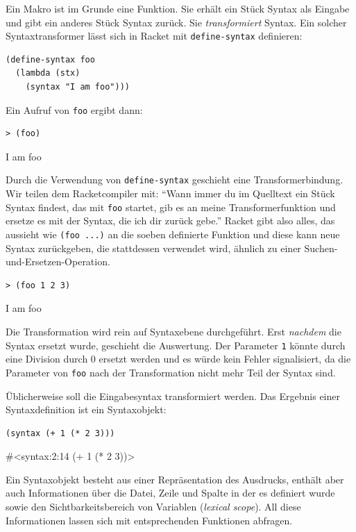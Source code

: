 Ein Makro ist im Grunde eine Funktion. Sie erhält ein Stück Syntax als Eingabe und gibt ein anderes Stück Syntax zurück. Sie \textit{transformiert} Syntax. Ein solcher Syntaxtransformer lässt sich in Racket mit \texttt{define-syntax} definieren:

\begin{lstlisting}
(define-syntax foo
  (lambda (stx)
    (syntax "I am foo")))
\end{lstlisting}

Ein Aufruf von \texttt{foo} ergibt dann:

\begin{lstlisting}
> (foo)
\end{lstlisting}
{\routput {\qq}I am foo{\qq}}

Durch die Verwendung von \texttt{define-syntax} geschieht eine Transformerbindung. Wir teilen dem Racketcompiler mit: ``Wann immer du im Quelltext ein Stück Syntax findest, das mit \texttt{foo} startet, gib es an meine Transformerfunktion und ersetze es mit der Syntax, die ich dir zurück gebe.'' Racket gibt also alles, das aussieht wie \texttt{(foo ...)} an die soeben definierte Funktion und diese kann neue Syntax zurückgeben, die stattdessen verwendet wird, ähnlich zu einer Suchen-und-Ersetzen-Operation.

\begin{lstlisting}
> (foo 1 2 3)
\end{lstlisting}
{\routput {\qq}I am foo\qq}

Die Transformation wird rein auf Syntaxebene durchgeführt. Erst \textit{nachdem} die Syntax ersetzt wurde, geschieht die Auswertung. Der Parameter \texttt{1} könnte  durch eine Division durch 0 ersetzt werden und es würde kein Fehler signalisiert, da die Parameter von \texttt{foo} nach der Transformation nicht mehr Teil der Syntax sind.

Üblicherweise soll die Eingabesyntax transformiert werden. Das Ergebnis einer Syntaxdefinition ist ein Syntaxobjekt:

\begin{lstlisting}
(syntax (+ 1 (* 2 3)))
\end{lstlisting}
{\routput\#<syntax:2:14 (+ 1 (* 2 3))>}

Ein Syntaxobjekt besteht aus einer Repräsentation des Ausdrucks, enthält aber auch Informationen über die Datei, Zeile und Spalte in der es definiert wurde sowie den Sichtbarkeitsbereich von Variablen (\emph{lexical scope}). All diese Informationen lassen sich mit entsprechenden Funktionen abfragen.

